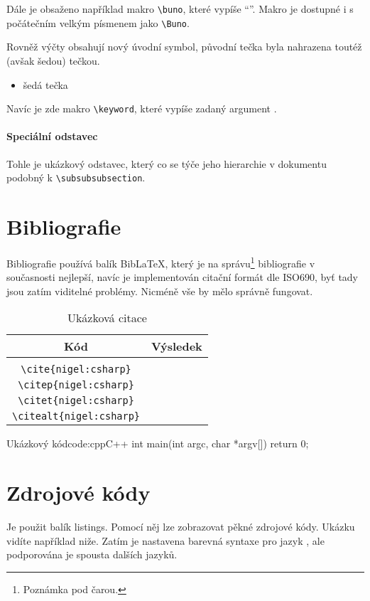 \documentclass[a4paper,12pt]{article}
\begin{document}
Dále je obsaženo například makro \verb|\buno|, které vypíše \enquote{\buno}. Makro je dostupné i s počátečním velkým písmenem jako \verb|\Buno|.

Rovněž výčty obsahují nový úvodní symbol, původní tečka byla nahrazena toutéž (avšak šedou) tečkou.
\begin{itemize}
\item šedá tečka
\end{itemize}

Navíc je zde makro \verb|\keyword|, které vypíše zadaný argument .

\paragraph{Speciální odstavec}
Tohle je ukázkový odstavec, který co se týče jeho hierarchie v dokumentu podobný k \verb|\subsubsubsection|.

\section{Bibliografie}
Bibliografie používá balík Bib\LaTeX, který je na správu\footnote{Poznámka pod čarou.} bibliografie v současnosti nejlepší, navíc je implementován citační formát dle ISO690, byť tady jsou zatím viditelné problémy. Nicméně vše by mělo správně fungovat.

\begin{table}
\caption{Ukázková citace}
\begin{center}
\begin{tabular}{c|l}
Kód & Výsledek \\
\hline \\
\verb|\cite{nigel:csharp}| & \cite{nigel:csharp} \\
\verb|\citep{nigel:csharp}| & \citep{nigel:csharp} \\
\verb|\citet{nigel:csharp}| & \citet{nigel:csharp} \\
\verb|\citealt{nigel:csharp}| & \citealt{nigel:csharp}
\end{tabular}
\end{center}
\end{table}

\begin{upcode}{Ukázkový \cpp kód}{code:cpp}{C++}
int main(int argc, char *argv[]) {
	return 0;
}
\end{upcode}

\section{Zdrojové kódy}
Je použit balík listings. Pomocí něj lze zobrazovat pěkné zdrojové kódy. Ukázku vidíte například niže. Zatím je nastavena barevná syntaxe pro jazyk \cpp, ale podporována je spousta dalších jazyků.
\end{document}
